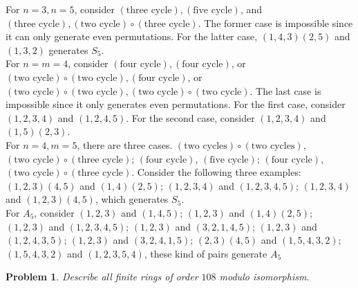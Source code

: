 \documentclass[12pt]{article}
\newtheorem{problem}{Problem}
\begin{document}
\indent For $n=3, n=5$, consider $(\text{three cycle}), (\text{five cycle})$, and $(\text{three cycle}), (\text{two cycle})\circ(\text{three cycle})$. The former case is impossible since it can only generate even permutations. For the latter case, $(1,4,3)(2,5)$ and $(1,3,2)$ generates $S_5$. \\
\indent For $n=m=4$, consider $(\text{four cycle}), (\text{four cycle})$, or $(\text{two cycle})\circ(\text{two cycle}), (\text{four cycle})$, or $(\text{two cycle})\circ(\text{two cycle}), (\text{two cycle})\circ(\text{two cycle})$. The last case is impossible since it only generates even permutations. For the first case, consider $(1, 2, 3, 4)$ and $(1, 2, 4, 5)$. For the second case, consider $(1, 2, 3, 4)$ and $(1, 5)(2, 3)$. \\
\indent For $n=4, m=5$, there are three cases. $(\text{two cycles})\circ(\text{two cycles})$, $(\text{two cycle})\circ(\text{three cycle})$; $(\text{four cycle})$, $(\text{five cycle})$; $(\text{four cycle})$, $(\text{two cycle})\circ(\text{three cycle})$. Consider the following three examples: $(1, 2, 3)(4, 5)$ and $(1, 4)(2, 5)$; $(1,2,3,4)$ and $(1,2,3,4,5)$; $(1,2,3,4)$ and $(1, 2, 3)(4,5)$, which generates $S_5$.\\
\indent For $A_{5}$, consider $(1, 2, 3)$ and $(1, 4, 5)$; $(1, 2, 3)$ and $(1, 4)(2, 5)$; $(1, 2, 3)$ and $(1, 2, 3, 4, 5)$; $(1, 2, 3)$ and $(3, 2, 1, 4, 5)$; $(1, 2, 3)$ and $(1, 2, 4, 3, 5)$; $(1, 2, 3)$ and $(3, 2, 4, 1, 5)$; $(2, 3)(4, 5)$ and $(1,5,4,3,2)$; $(1, 5, 4,3,2)$ and $(1, 2, 3, 5,4 )$,  these kind of pairs generate $A_5$

\begin{problem}
Describe all finite rings of order $108$ modulo isomorphism.
\end{problem}
\end{document}
